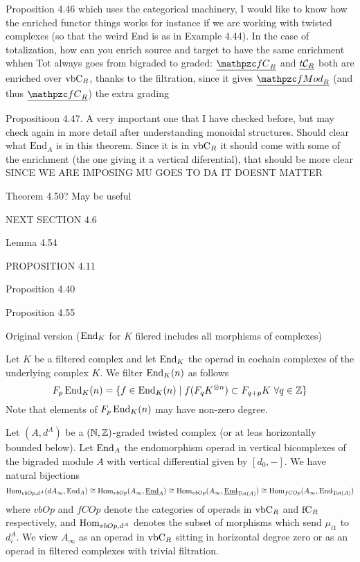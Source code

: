 \documentclass[twoside]{article}
\begin{document}
Proposition 4.46 which uses the categorical machinery, I would like to know how the enriched functor things works for instance if we are working with twisted complexes (so that the weird End is as in Example 4.44). In the case of totalization, how can you enrich source and target to have the same enrichment whhen Tot always goes from bigraded to graded: $\ufC$ and $\underline{t\mathcal{C}_R}$ both are enriched over $\mathrm{vbC}_R$, thanks to the filtration, since it gives $\ufMod$ (and thus $\ufC$) the extra grading

Propositioon 4.47. A very important one that I have checked before, but may check again in more detail after understanding monoidal structures. Should clear what $\mathrm{End}_A$ is in this theorem. Since it is in $\mathrm{vbC}_R$ it should come with some of the enrichment (the one giving it a vertical diferential), that should be more clear SINCE WE ARE IMPOSING MU GOES TO DA IT DOESNT MATTER

Theorem 4.50? May be useful

NEXT SECTION 4.6

Lemma 4.54

PROPOSITION 4.11 

Proposition 4.40

Proposition 4.55


Original version ($\operatorname{End}_K$ for $K$ filered includes all morphisms of complexes)

Let $K$ be a filtered complex and let $\operatorname{End}_K$ the operad in cochain complexes of the underlying complex $K$. We filter $\operatorname{End}_K(n)$ as follows
\[F_p\operatorname{End}_K(n)=\{f\in\operatorname{End}_K(n)\mid f(F_qK^{\otimes n})\subset F_{q+p}K\ \forall q\in\mathbb{Z}\}\]
Note that elements of $F_p\operatorname{End}_K(n)$ may have non-zero degree.
\begin{thm}
Let $(A,d^A)$ be a  $(\mathbb{N},\mathbb{Z})$-graded twisted complex (or at leas horizontally bounded below). Let $\operatorname{End}_A$ the endomorphism operad in vertical bicomplexes of the bigraded module $A$ with vertical differential given by $[d_0,-]$. We have natural bijections
\[\operatorname{Hom}_{vbOp,d^A}(dA_\infty,\operatorname{End}_A)\cong \operatorname{Hom}_{vbOp}(A_\infty,\underline{\operatorname{End}}_A)\cong  \operatorname{Hom}_{vbOp}(A_\infty,\underline{\operatorname{End}}_{\mathrm{Tot}(A)})\cong\operatorname{Hom}_{fCOp}(A_\infty,\operatorname{End}_{\mathrm{Tot}(A)})\]
where $vbOp$ and $fCOp$ denote the categories of operads in $\mathrm{vbC}_R$ and $\mathrm{fC}_R$ respectively, and $\operatorname{Hom}_{vbOp,d^A}$ denotes the subset of morphisms which send $μ_{i1}$ to $d^A_i$. We view $A_∞$ as an operad in $\mathrm{vbC}_R$ sitting in horizontal degree zero or as an operad in filtered complexes with trivial filtration.
\end{thm}
\end{document}
